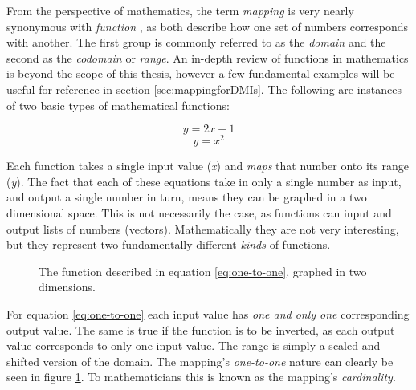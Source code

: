 From the perspective of mathematics, the term \emph{mapping} is very nearly synonymous with \emph{function} \cite{native_set_theory}, as both describe how one set of numbers corresponds with another. The first group is commonly referred to as the \emph{domain} and the second as the \emph{codomain} or \emph{range}. An in-depth review of functions in mathematics is beyond the scope of this thesis, however a few fundamental examples will be useful for reference in section \ref{sec:mappingforDMIs}. The following are instances of two basic types of mathematical functions:

\begin{equation} y = 2x - 1 \label{eq:one-to-one} \end{equation} 
\begin{equation} y = x^2  \label{eq:many-to-one}  \end{equation}

Each function takes a single input value (\emph{x}) and \emph{maps} that number onto its range (\emph{y}). 
The fact that each of these equations take in only a single number as input, and output a single number in turn, means they can be graphed in a two dimensional space. This is not necessarily the case, as functions can input and output lists of numbers (vectors). Mathematically they are not very interesting, but they represent two fundamentally different \emph{kinds} of functions.

\begin{figure}[h]
	\centering
\caption{The function described in equation \ref{eq:one-to-one}, graphed in two dimensions.}
\label{fig:one-to-one_graph}
\end{figure}

For equation \ref{eq:one-to-one} each input value has \emph{one and only one} corresponding output value. The same is true if the function is to be inverted, as each output value corresponds to only one input value. The range is simply a scaled and shifted version of the domain. The mapping's \emph{one-to-one} nature can clearly be seen in figure \ref{fig:one-to-one_graph}. To mathematicians this is known as the mapping's \emph{cardinality}.

